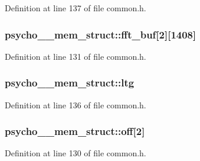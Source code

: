 Definition at line 137 of file common.\+h.

\subsubsection[{\texorpdfstring{fft\+\_\+buf}{fft_buf}}]{ psycho\+\_\+\_\+mem\+\_\+struct\+::fft\+\_\+buf\mbox{[}2\mbox{]}\mbox{[}1408\mbox{]}}\hypertarget{structpsycho__1__mem__struct_aa6c016d9438353036cbd1734805d9814}{}\label{structpsycho__1__mem__struct_aa6c016d9438353036cbd1734805d9814}


Definition at line 131 of file common.\+h.

\subsubsection[{\texorpdfstring{ltg}{ltg}}]{ psycho\+\_\+\_\+mem\+\_\+struct\+::ltg}\hypertarget{structpsycho__1__mem__struct_a3757d4106ac278c815a5214045286e0c}{}\label{structpsycho__1__mem__struct_a3757d4106ac278c815a5214045286e0c}


Definition at line 136 of file common.\+h.

\subsubsection[{\texorpdfstring{off}{off}}]{ psycho\+\_\+\_\+mem\+\_\+struct\+::off\mbox{[}2\mbox{]}}\hypertarget{structpsycho__1__mem__struct_af017ea48db79318795b4324e9d4ed1c2}{}\label{structpsycho__1__mem__struct_af017ea48db79318795b4324e9d4ed1c2}


Definition at line 130 of file common.\+h.

